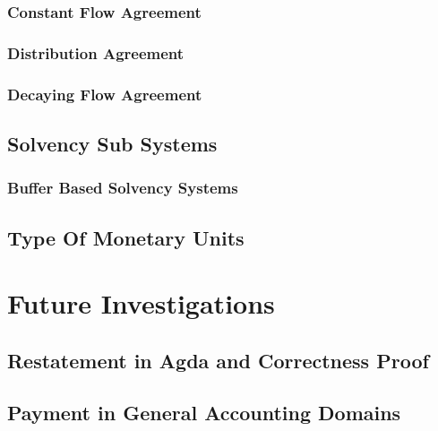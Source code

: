 \subsection{Constant Flow Agreement}

\subsection{Distribution Agreement}

\subsection{Decaying Flow Agreement}

\section{Solvency Sub Systems}

\subsection{Buffer Based Solvency Systems}

\section{Type Of Monetary Units}

\chapter{Future Investigations}

\section{Restatement in Agda and Correctness Proof}

\section{Payment in General Accounting Domains}

\newpage
\printbibliography{}


